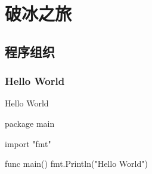 \begin{savequote}[45mm]
\end{savequote}

\chapter{破冰之旅} 
\label{ch:quick-start}

\begin{content}

\end{content}

\section{程序组织}

\begin{content}

\subsection{Hello World}

\begin{nodiff}{Hello World}
 \begin{go}
package main

import "fmt"

func main() {
  fmt.Println("Hello World")
}
 \end{go}
\end{nodiff}

\end{content}
